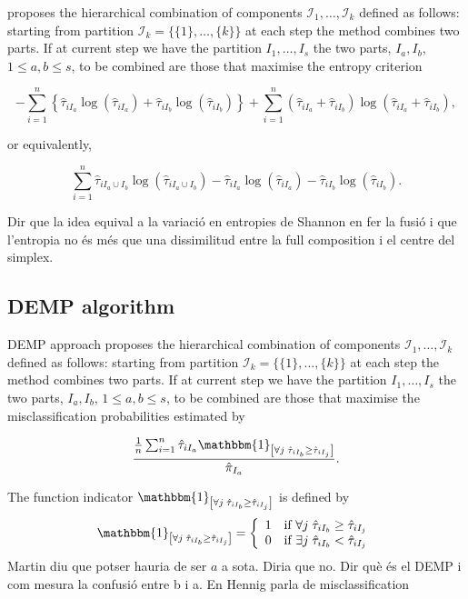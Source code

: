 \documentclass[10pt, a4paper]{article}
\begin{document}
\cite{baudry2010combining} proposes the  hierarchical combination of components  $\mathcal{I}_1, \dots, \mathcal{I}_k$ defined as follows: starting from partition $\mathcal{I}_k = \{\{1\},\dots, \{k\}\}$ at each step the method combines two parts. If at current step we have the partition  $I_1, \dots, I_s$ the two parts, $I_a, I_b$, $1 \leq a,b \leq s$, to be combined are those that maximise the entropy criterion

\[
- \sum_{i=1}^n \left\{ \hat{\tau}_{iI_a} \log(\hat{\tau}_{iI_a}) + \hat{\tau}_{iI_b} \log(\hat{\tau}_{iI_b})\right\} +  \sum_{i=1}^n  (\hat{\tau}_{iI_a}+\hat{\tau}_{iI_b}) \log(\hat{\tau}_{iI_a} + \hat{\tau}_{iI_b}),
\]

or equivalently,

\[
 \sum_{i=1}^n \hat{\tau}_{i I_a \cup I_b} \log(\hat{\tau}_{i I_a \cup I_b}) - \hat{\tau}_{iI_a} \log(\hat{\tau}_{iI_a}) - \hat{\tau}_{iI_b} \log(\hat{\tau}_{iI_b}).
\]

{\color{red} Dir que la idea equival a la variació en entropies de Shannon en fer la fusió  i que l'entropia no és més que una dissimilitud entre la full composition i el centre del simplex.}

\subsection*{DEMP algorithm}


DEMP approach \citep{hennig2010methods} proposes the hierarchical combination of components  $\mathcal{I}_1, \dots, \mathcal{I}_k$ defined as follows: starting from partition $\mathcal{I}_k = \{\{1\},\dots, \{k\}\}$ at each step the method combines two parts. If at current step we have the partition  $I_1, \dots, I_s$ the two parts, $I_a, I_b$, $1 \leq a,b \leq s$,  to be combined are those that maximise the misclassification probabilities estimated by 

\begin{equation}\label{demp_criteria}
\frac{ \frac{1}{n} \sum_{i=1}^n {\hat{\tau}_{iI_a} \mathbbm{1}_{\left[ \forall j\; \hat{\tau}_{i I_{b}} \geq \hat{\tau}_{iI_j} \right]}}}{ \hat{\pi}_{I_a}}.
\end{equation}

The function indicator $\mathbbm{1}_{\left[ \forall j\; \hat{\tau}_{i I_{b}} \geq \hat{\tau}_{iI_j} \right]}$ is defined by
\[
\mathbbm{1}_{\left[ \forall j\; \hat{\tau}_{i I_{b}} \geq \hat{\tau}_{iI_j} \right]} =
\left\{\begin{array}{ll}	
1 & \text{if $\forall j\; \hat{\tau}_{i I_{b}} \geq \hat{\tau}_{iI_j}$}\\
0 & \text{if $\exists j\; \hat{\tau}_{i I_{b}} < \hat{\tau}_{iI_j}$}
\end{array}\right.
\]
{\color{red} Martin diu que potser hauria de ser $a$ a sota.  Diria que no.}
{\color{red} Dir què és el DEMP i com mesura la confusió entre b i a. En Hennig parla de misclassification}
\end{document}
